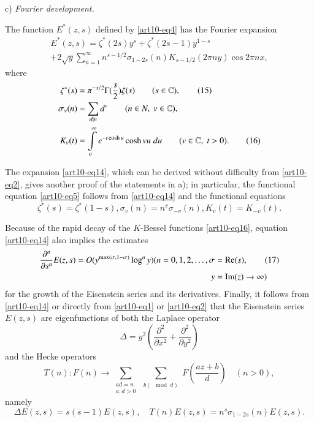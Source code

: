 c) \textit{Fourier development.}

The function $E^\ast(z,s)$ defined by \eqref{art10-eq4} has the Fourier expansion
\begin{gather*}
E^\ast (z,s) = \zeta^\ast (2s) y^s + \zeta^\ast (2s -1 ) y^{1-s} \tag{14}\label{art10-eq14}\\
+ 2 \sqrt{y} \sum\limits^\infty_{n=1} n^{s-1/2} \sigma_{1-2s} (n) K_{s-1/2} (2 \pi n y) \cos 2 \pi n x,
\end{gather*}
where 
\begin{align*}
\zeta^\ast (s) & = \pi^{-s/2} \Gamma (\frac{s}{2}) \zeta(s) \qquad (s \in \mathbb{C}), \tag{15}\label{art10-eq15}\\
\sigma_v (n) & = \sum\limits_{d |n} d^v \qquad (n\in N, \; v \in \mathbb{C}),\\
K_v (t) & = \int\limits^\infty_o e^{-t \cosh u} \cosh v u \; du \qquad (v \in \mathbb{C}, \; t > 0).
\tag{16}\label{art10-eq16}
\end{align*}

The expansion \eqref{art10-eq14}, which can be derived without difficulty from \eqref{art10-eq2}, gives another proof of the statements in a); in particular, the functional equation \eqref{art10-eq5} follows from \eqref{art10-eq14} and the functional equations 
$$
\zeta^\ast (s) = \zeta^\ast (1-s) , \sigma_v (n) = n^v \sigma_{-v} (n), K_v (t) = K_{-v} (t). 
$$

Because of the rapid decay of the $K$-Bessel functions \eqref{art10-eq16}, equation \eqref{art10-eq14} also implies the estimates
\begin{align*}
\frac{\partial^n}{\partial s^n} E (z,s) = O (y^{\max (\sigma , 1 -\sigma)} \log^n y) (n = 0, 1, 2,\ldots , \sigma &= \operatorname{Re} (s), \tag{17} \label{art10-eq17}\\
y & = \operatorname{Im} (z) \to \infty)
\end{align*}
for the growth of the Eisenstein series and its derivatives. Finally, it follows from \eqref{art10-eq14} or directly from \eqref{art10-eq1} or \eqref{art10-eq2} that the Eisenstein series $E (z,s)$ are eigenfunctions of both the Laplace operator 
$$
\Delta = y^2 \left(\frac{\partial^2}{\partial x^2} + \frac{\partial^2 }{\partial y^2} \right)
$$
and the Hecke operators 
$$
T (n): F (n) \to \sum\limits_{\substack{ad = n \\ a, d >0}} \sum\limits_{\substack{b (\mod d)}} F (\frac{az+b}{d}) \quad (n>0), 
$$
namely\pageoriginale
\begin{equation*}
\Delta E (z,s) = s (s-1) E (z,s), \quad T (n) E (z,s) = n^s \sigma_{1-2s} (n) E (z,s) . \tag{18}\label{art10-eq18}
\end{equation*}


